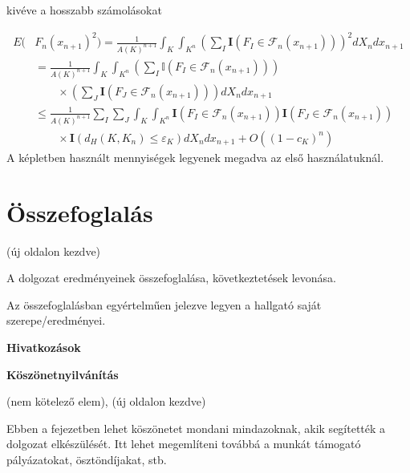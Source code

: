 \documentclass[a4paper,12pt]{report}
\theoremstyle{definition}
\theoremstyle{remark}
\begin{document}
kivéve a hosszabb számolásokat

\begin{align}
E (& F_n(x_{n+1})^2) = \frac 1{A(K)^{n+1}}\int_K\int_{K^n} \left (\sum_I \mathbf I (F_I\in\mathcal F_{n}(x_{n+1}))\right )^2 d X_n d x_{n+1}\nonumber\\
& = \frac 1{A(K)^{n+1}} \int_K\int_{K^n} \left (\sum_I \mathbb I (F_I\in\mathcal F_{n}(x_{n+1}))\right ) \nonumber \\
& \quad \quad \times \left (\sum_J \mathbf I (F_J\in\mathcal F_{n}(x_{n+1}))\right ) d X_n d x_{n+1}\nonumber\\
&\leq \frac 1{A(K)^{n+1}}\sum_I\sum_J \int_K\int_{K^n} \mathbf I (F_I\in\mathcal F_{n}(x_{n+1}))
\mathbf I (F_J\in\mathcal F_{n}(x_{n+1}))\nonumber\\
&\quad\quad\times\mathbf I(d_H(K,K_n)\leq\varepsilon_K) d X_n d x_{n+1}
+O((1-c_K)^n)\label{ineq1}
\end{align}
A képletben használt mennyiségek legyenek megadva az első használatuknál.
\chapter{Összefoglalás}

(új oldalon kezdve)

A dolgozat eredményeinek összefoglalása, következtetések levonása.

Az összefoglalásban egyértelműen jelezve legyen a hallgató saját szerepe/eredményei. \cite{knuthwebsite}

\newpage
{\Huge \bf Hivatkozások}

 
 

\newpage
{\Huge \bf Köszönetnyilvánítás}


\vspace{2 cm}

(nem kötelező elem), (új oldalon kezdve) 

Ebben a fejezetben lehet köszönetet mondani mindazoknak, akik segítették a dolgozat elkészülését. Itt lehet megemlíteni továbbá a munkát támogató pályázatokat, ösztöndíjakat, stb.
\end{document}
